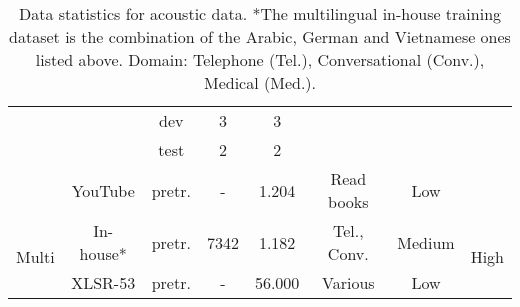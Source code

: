 \begin{table}[!h]
\begin{adjustbox}{width=\columnwidth,center}
\begin{tabular}{|l|c|c|c|c|c|c|c|}
\cline{3-5}
                            &                         & dev                                                       & 3       & 3      &                                                                              &                                                           &                                                            \\ 
\cline{3-5}
                            &                         & test                                                      & 2       & 2      &                                                                              &                                                           &                                                            \\ 
\cline{2-7}
                            & YouTube                 & pretr.                                                    & -       & 1.204  & Read books                                                                   & Low                                                       &                                                            \\ 
\hline
\multirow{2}{*}{Multi}      & In-house*               & pretr.                                                    & 7342    & 1.182  & Tel., Conv.                                                                  & Medium                                                    & \multirow{2}{*}{High}                                      \\ 
\cline{2-7}
                            & XLSR-53                 & pretr.                                                    & -       & 56.000 & Various                                                                      & Low                                                       &                                                            \\
\hline
\end{tabular}
\end{adjustbox}
\caption{Data statistics for acoustic data. *The multilingual in-house training dataset is the combination of the Arabic, German and Vietnamese ones listed above. Domain: Telephone (Tel.), Conversational (Conv.), Medical (Med.).}
\label{table:data_stats}
\end{table}